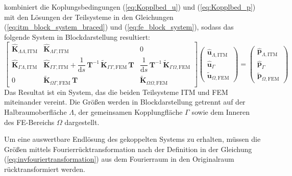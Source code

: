 \cite{Hackenberg2016} kombiniert die Koplungsbedingungen (\ref{eq:Kopplbed_u}) und (\ref{eq:Kopplbed_p}) mit den Lösungen der Teilsysteme in den Gleichungen (\ref{eq:itm_block_system_braced}) und (\ref{eq:fe_block_system}), sodass das folgende System in Blockdarstellung resultiert:
\begin{equation}\label{eq:gekoppelt}
	\begin{bmatrix}
		\hat{\mathbf K}_{\Lambda\Lambda,\mathrm{ITM}} &
		\hat{\mathbf K}_{\Lambda\Gamma,\mathrm{ITM}}   &
		0 \\[6pt]
		\hat{\mathbf K}_{\Gamma\Lambda,\mathrm{ITM}}   &
		\hat{\mathbf K}_{\Gamma\Gamma,\mathrm{ITM}}
		+ \dfrac{1}{\mathrm d s}\,\mathbf T^{-1}\,\tilde{\mathbf K}_{\Gamma\Gamma,\mathrm{FEM}}\,\mathbf T &
		\dfrac{1}{\mathrm d s}\,\mathbf T^{-1}\,\tilde{\mathbf K}_{\Gamma\Omega,\mathrm{FEM}} \\[6pt]
		0 &
		\tilde{\mathbf K}_{\Omega\Gamma,\mathrm{FEM}}\,\mathbf T &
		\tilde{\mathbf K}_{\Omega\Omega,\mathrm{FEM}}
	\end{bmatrix}
	\begin{pmatrix}
		\hat{\mathbf u}_{\Lambda,\mathrm{ITM}}\\[2pt]
		\hat{\mathbf u}_{\Gamma}\\[2pt]
		\tilde{\mathbf u}_{\Omega,\mathrm{FEM}}
	\end{pmatrix}
	=
	\begin{pmatrix}
		\hat{\mathbf p}_{\Lambda,\mathrm{ITM}}\\[2pt]
		\hat{\mathbf p}_{\Gamma}\\[2pt]
		\tilde{\mathbf p}_{\Omega,\mathrm{FEM}}
	\end{pmatrix}
\end{equation}
Das Resultat ist ein System, das die beiden Teilsysteme ITM und FEM miteinander vereint. 
Die Größen werden in Blockdarstellung getrennt auf der Halbraumoberfläche $\Lambda$, der gemeinsamen Kopplungfläche $\Gamma$ sowie dem Inneren des FE-Bereichs $\Omega$ dargestellt.

Um eine auswertbare Endlösung des gekoppelten Systems zu erhalten, müssen die Größen mittels Fourierrücktransformation nach der Definition in der Gleichung (\ref{eq:invfouriertransformation}) aus dem Fourierraum in den Originalraum rücktransformiert werden.

